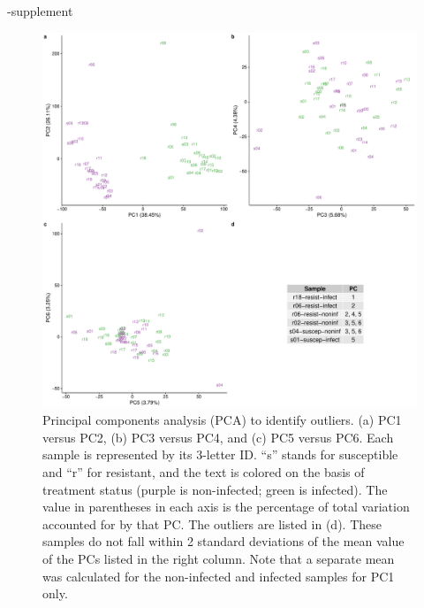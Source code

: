 \documentclass[fleqn,10pt]{wlscirep}
\begin{document}
\begin{filecontents}{\jobname-supplement}
\begin{figure}[ht]
\centering
\includegraphics[width=\linewidth]{../figure/outliers.pdf}
\caption{
Principal components analysis (PCA) to identify outliers. (a) PC1
versus PC2, (b) PC3 versus PC4, and (c) PC5 versus PC6. Each sample is
represented by its 3-letter ID. “s” stands for susceptible and “r” for
resistant, and the text is colored on the basis of treatment status
(purple is non-infected; green is infected). The value in parentheses
in each axis is the percentage of total variation accounted for by
that PC. The outliers are listed in (d). These samples do not fall
within 2 standard deviations of the mean value of the PCs listed in
the right column. Note that a separate mean was calculated for the
non-infected and infected samples for PC1 only.
}
\label{fig:outliers}
\end{figure}



\end{filecontents}
\end{document}
